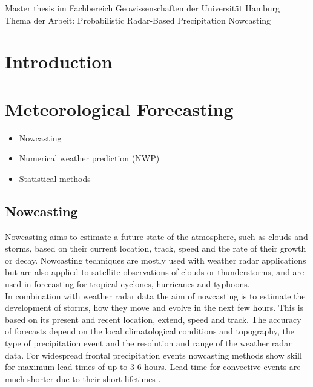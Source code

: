 \documentclass[11pt,twoside,a4paper,fleqn,x11names]{report}
\numberwithin{equation}{chapter}
\numberwithin{figure}{chapter}
\numberwithin{table}{chapter}
\begin{document}
	\newpage
	\thispagestyle{empty}
	\null
	\vfill
	Master thesis im Fachbereich Geowissenschaften der Universität Hamburg\\
	Thema der Arbeit: \glqq Probabilistic Radar-Based Precipitation Nowcasting\grqq
	
	
\newpage
\renewcommand{\abstractname}{\huge \flushleft Abstract}
\begin{abstract}
\null
\end{abstract}
\thispagestyle{empty}
\pagestyle{empty}
\tableofcontents
\listoffigures
\listoftables
\newpage\pagestyle{fancy}
\chapter{Introduction}
\chapter{Meteorological Forecasting}
\begin{itemize}
	\item Nowcasting
	\item Numerical weather prediction (NWP)
	\item Statistical methods
\end{itemize}
\section{Nowcasting}
\label{chap:nowcasting}
Nowcasting aims to estimate a future state of the atmosphere, such as clouds and storms, based on their current location, track, speed and the rate of their growth or decay. Nowcasting techniques are mostly used with weather radar applications but are also applied to satellite observations of clouds or thunderstorms, and are used in forecasting for tropical cyclones, hurricanes and typhoons.\\
In combination with weather radar data the aim of nowcasting is to estimate the development of storms, how they move and evolve in the next few hours. This is based on its present and recent location, extend, speed and track. The accuracy of forecasts depend on the local climatological conditions and topography, the type of precipitation event and the resolution and range of the weather radar data. For widespread frontal precipitation events nowcasting methods show skill for maximum lead times of up to 3-6 hours. Lead time for convective events are much shorter due to their short lifetimes \citep{Sene2009}.
\end{document}

